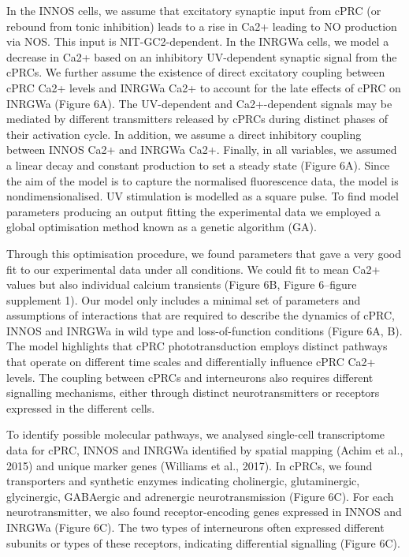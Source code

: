 \documentclass[
  10pt,
  onecolumn]{article}
\begin{document}
In the INNOS cells, we assume that excitatory synaptic input from cPRC
(or rebound from tonic inhibition) leads to a rise in Ca2+ leading to NO
production via NOS. This input is NIT-GC2-dependent. In the INRGWa
cells, we model a decrease in Ca2+ based on an inhibitory UV-dependent
synaptic signal from the cPRCs. We further assume the existence of
direct excitatory coupling between cPRC Ca2+ levels and INRGWa Ca2+ to
account for the late effects of cPRC on INRGWa (Figure 6A). The
UV-dependent and Ca2+-dependent signals may be mediated by different
transmitters released by cPRCs during distinct phases of their
activation cycle. In addition, we assume a direct inhibitory coupling
between INNOS Ca2+ and INRGWa Ca2+. Finally, in all variables, we
assumed a linear decay and constant production to set a steady state
(Figure 6A). Since the aim of the model is to capture the normalised
fluorescence data, the model is nondimensionalised. UV stimulation is
modelled as a square pulse. To find model parameters producing an output
fitting the experimental data we employed a global optimisation method
known as a genetic algorithm (GA).

Through this optimisation procedure, we found parameters that gave a
very good fit to our experimental data under all conditions. We could
fit to mean Ca2+ values but also individual calcium transients (Figure
6B, Figure 6--figure supplement 1). Our model only includes a minimal
set of parameters and assumptions of interactions that are required to
describe the dynamics of cPRC, INNOS and INRGWa in wild type and
loss-of-function conditions (Figure 6A, B). The model highlights that
cPRC phototransduction employs distinct pathways that operate on
different time scales and differentially influence cPRC Ca2+ levels. The
coupling between cPRCs and interneurons also requires different
signalling mechanisms, either through distinct neurotransmitters or
receptors expressed in the different cells.

To identify possible molecular pathways, we analysed single-cell
transcriptome data for cPRC, INNOS and INRGWa identified by spatial
mapping (Achim et al., 2015) and unique marker genes (Williams et al.,
2017). In cPRCs, we found transporters and synthetic enzymes indicating
cholinergic, glutaminergic, glycinergic, GABAergic and adrenergic
neurotransmission (Figure 6C). For each neurotransmitter, we also found
receptor-encoding genes expressed in INNOS and INRGWa (Figure 6C). The
two types of interneurons often expressed different subunits or types of
these receptors, indicating differential signalling (Figure 6C).
\end{document}

